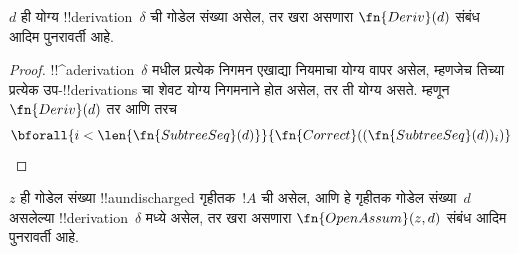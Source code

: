 \documentclass[../../../include/open-logic-section]{subfiles}
\begin{document}
\begin{prop}
  $d$ ही योग्य !!{derivation}~$\delta$ ची गोडेल संख्या असेल,
  तर खरा असणारा $\fn{Deriv}(d)$ संबंध आदिम पुनरावर्ती आहे.
\end{prop}

\begin{proof}
  !!^a{derivation}~$\delta$ मधील प्रत्येक निगमन एखाद्या नियमाचा
  योग्य वापर असेल, म्हणजेच तिच्या प्रत्येक उप-!!{derivation}s चा
  शेवट योग्य निगमनाने होत असेल, तर ती योग्य असते. म्हणून
  $\fn{Deriv}(d)$ तर आणि तरच
  \[
  \bforall{i<\len{\fn{SubtreeSeq}(d)}}{\fn{Correct}((\fn{SubtreeSeq}(d))_i)}
  \]
\end{proof}

\begin{prop}
   $z$ ही गोडेल संख्या
  !!a{undischarged} गृहीतक~$!A$ ची असेल, आणि हे गृहीतक
  गोडेल संख्या~$d$ असलेल्या !!{derivation}~$\delta$ मध्ये असेल,
  तर खरा असणारा $\fn{OpenAssum}(z, d)$ संबंध आदिम पुनरावर्ती आहे.
\end{prop}
\end{document}
